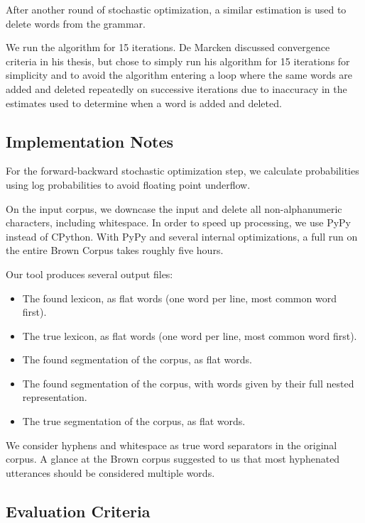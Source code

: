 \documentclass[11pt, oneside, fleqn]{article}
\begin{document}
  After another round of stochastic optimization, a similar estimation is used to delete words from the grammar. 
  
  We run the algorithm for 15 iterations. De Marcken discussed convergence criteria in his thesis, but chose to simply run his algorithm for 15 iterations for simplicity and to avoid the algorithm entering a loop where the same words are added and deleted repeatedly on successive iterations due to inaccuracy in the estimates used to determine when a word is added and deleted.
  
  \subsection*{Implementation Notes}
  
  For the forward-backward stochastic optimization step, we calculate probabilities using log probabilities to avoid floating point underflow.

  On the input corpus, we downcase the input and delete all non-alphanumeric characters, including whitespace. In order to speed up processing, we use PyPy instead of CPython. With PyPy and several internal optimizations, a full run on the entire Brown Corpus takes roughly five hours.
  
  Our tool produces several output files:

  \begin{itemize}
    \item The found lexicon, as flat words (one word per line, most common word first).
    \item The true lexicon, as flat words (one word per line, most common word first).
    \item The found segmentation of the corpus, as flat words.
    \item The found segmentation of the corpus, with words given by their full nested representation.
    \item The true segmentation of the corpus, as flat words. 
  \end{itemize}

	We consider hyphens and whitespace as true word separators in the original corpus. A glance at the Brown corpus suggested to us that most hyphenated utterances should be considered multiple words.

  \subsection*{Evaluation Criteria}
\end{document}
